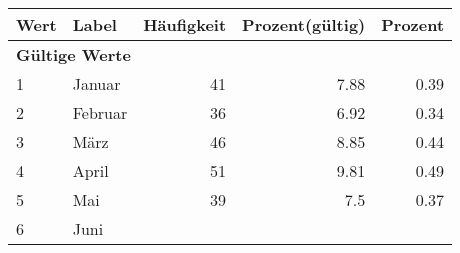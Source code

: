      \begin{longtable}{lXrrr}
     \toprule
     \textbf{Wert} & \textbf{Label} & \textbf{Häufigkeit} & \textbf{Prozent(gültig)} & \textbf{Prozent} \\
     \endhead
     \midrule
     \multicolumn{5}{l}{\textbf{Gültige Werte}}\\

     1 &
     \multicolumn{1}{X}{ Januar   } &


       \num{41} &
       \num[round-mode=places,round-precision=2]{7,88} &
         \num[round-mode=places,round-precision=2]{0,39} \\

     2 &
     \multicolumn{1}{X}{ Februar   } &


       \num{36} &
       \num[round-mode=places,round-precision=2]{6,92} &
         \num[round-mode=places,round-precision=2]{0,34} \\

     3 &
     \multicolumn{1}{X}{ März   } &


       \num{46} &
       \num[round-mode=places,round-precision=2]{8,85} &
         \num[round-mode=places,round-precision=2]{0,44} \\

     4 &
     \multicolumn{1}{X}{ April   } &


       \num{51} &
       \num[round-mode=places,round-precision=2]{9,81} &
         \num[round-mode=places,round-precision=2]{0,49} \\

     5 &
     \multicolumn{1}{X}{ Mai   } &


       \num{39} &
       \num[round-mode=places,round-precision=2]{7,5} &
         \num[round-mode=places,round-precision=2]{0,37} \\

     6 &
     \multicolumn{1}{X}{ Juni   } &



\end{longtable}
